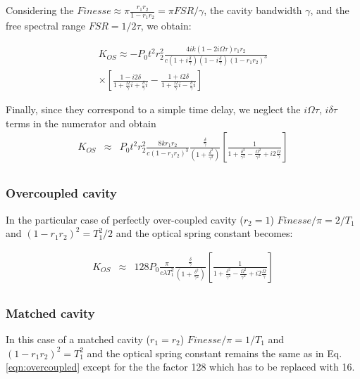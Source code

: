 Considering the $Finesse \approx \pi \frac{r_1r_2}{1-r_1r_2}= \pi FSR/\gamma$, the cavity bandwidth $\gamma$, and the free spectral range $FSR=1/2\tau$, we obtain:

\begin{eqnarray}
K_{OS}\approx-P_0 t^2 r_2^2 \frac{4ik(1-2i\Omega\tau)r_1r_2}{c(1+i\frac{\delta}{\gamma})(1-i\frac{\delta}{\gamma})(1-r_1r_2)^3} \nonumber\\
\times\left[\frac{1-i2\delta}{1+\frac{\Omega}{\gamma}i+\frac{\delta}{\gamma}i} -
\frac{1+i2\delta}{1+\frac{\Omega}{\gamma}i-\frac{\delta}{\gamma}i}
\right]
\end{eqnarray}

Finally, since they correspond to a simple time delay, we neglect the $i\Omega\tau$, $i\delta\tau$ terms in the numerator and obtain
\begin{eqnarray}
K_{OS} & \approx & P_0 t^2 r_2^2 \frac{8k r_1r_2}{c(1-r_1r_2)^3}\frac{ \frac{\delta}{\gamma}}{(1+\frac{\delta^2}{\gamma^2})} 
\left[\frac{1}{1+\frac{\delta^2}{\gamma^2}-\frac{\Omega^2}{\gamma^2}+i2\frac{\Omega}{\gamma} }\right]\nonumber\\
\end{eqnarray}

\subsubsection{Overcoupled cavity}

In the particular case of perfectly over-coupled cavity ($r_2=1$) $Finesse/\pi=2/T_1$ and $(1-r_1r_2)^2=T_1^2/2$ and the optical spring constant becomes:

\begin{eqnarray}
K_{OS} & \approx & 128 P_0  \frac{\pi}{c\lambda T_1^2}\frac{ \frac{\delta}{\gamma}}{(1+\frac{\delta^2}{\gamma^2})} 
\left[\frac{1}{1+\frac{\delta^2}{\gamma^2}-\frac{\Omega^2}{\gamma^2}+i2\frac{\Omega}{\gamma} }\right]\nonumber\\
\label{eqn:overcoupled}
\end{eqnarray}

\subsubsection{Matched cavity}

In this case of a matched cavity ($r_1=r_2$) $Finesse/\pi=1/T_1$ and $(1-r_1r_2)^2=T_1^2$ and the optical spring constant remains the same as in Eq.\,\ref{eqn:overcoupled} except for the the factor 128 which has to be replaced with 16.



